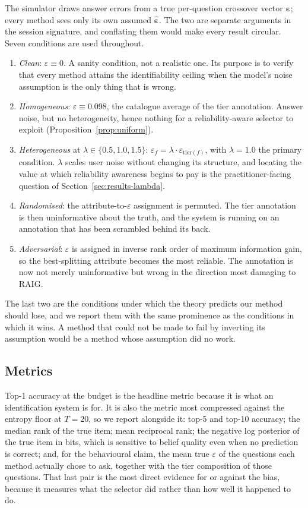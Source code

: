 The simulator draws answer errors from a true per-question crossover vector
$\boldsymbol\varepsilon$; every method sees only its own assumed
$\hat{\boldsymbol\varepsilon}$. The two are separate arguments in the session
signature, and conflating them would make every result circular. Seven
conditions are used throughout.

\begin{enumerate}
\item \emph{Clean}: $\varepsilon \equiv 0$. A sanity condition, not a realistic
one. Its purpose is to verify that every method attains the identifiability
ceiling when the model's noise assumption is the only thing that is wrong.
\item \emph{Homogeneous}: $\varepsilon \equiv 0.098$, the catalogue average of
the tier annotation. Answer noise, but no heterogeneity, hence nothing for a
reliability-aware selector to exploit (Proposition~\ref{prop:uniform}).
\item \emph{Heterogeneous} at $\lambda \in \{0.5, 1.0, 1.5\}$:
$\varepsilon_f = \lambda \cdot \varepsilon_{\mathrm{tier}(f)}$, with
$\lambda=1.0$ the primary condition. $\lambda$ scales user noise without
changing its structure, and locating the value at which reliability awareness
begins to pay is the practitioner-facing question of
Section~\ref{sec:results-lambda}.
\item \emph{Randomised}: the attribute-to-$\varepsilon$ assignment is permuted.
The tier annotation is then uninformative about the truth, and the system is
running on an annotation that has been scrambled behind its back.
\item \emph{Adversarial}: $\varepsilon$ is assigned in inverse rank order of
maximum information gain, so the best-splitting attribute becomes the most
reliable. The annotation is now not merely uninformative but wrong in the
direction most damaging to RAIG.
\end{enumerate}

The last two are the conditions under which the theory predicts our method
should lose, and we report them with the same prominence as the conditions in
which it wins. A method that could not be made to fail by inverting its
assumption would be a method whose assumption did no work.

\subsection{Metrics}
\label{sec:metrics}

Top-1 accuracy at the budget is the headline metric because it is what an
identification system is for. It is also the metric most compressed against the
entropy floor at $T=20$, so we report alongside it: top-5 and top-10 accuracy;
the median rank of the true item; mean reciprocal rank; the negative log
posterior of the true item in bits, which is sensitive to belief quality even
when no prediction is correct; and, for the behavioural claim, the mean true
$\varepsilon$ of the questions each method actually chose to ask, together with
the tier composition of those questions. That last pair is the most direct
evidence for or against the bias, because it measures what the selector did
rather than how well it happened to do.

